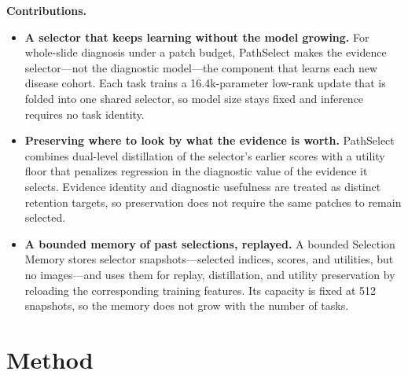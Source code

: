 \documentclass{article}
\begin{document}
\textbf{Contributions.}
\begin{itemize}
    \item \textbf{A selector that keeps learning without the model growing.} For whole-slide diagnosis under a patch budget, PathSelect makes the evidence selector---not the diagnostic model---the component that learns each new disease cohort. Each task trains a 16.4k-parameter low-rank update that is folded into one shared selector, so model size stays fixed and inference requires no task identity.
    \item \textbf{Preserving where to look by what the evidence is worth.} PathSelect combines dual-level distillation of the selector's earlier scores with a utility floor that penalizes regression in the diagnostic value of the evidence it selects. Evidence identity and diagnostic usefulness are treated as distinct retention targets, so preservation does not require the same patches to remain selected.
    \item \textbf{A bounded memory of past selections, replayed.} A bounded Selection Memory stores selector snapshots---selected indices, scores, and utilities, but no images---and uses them for replay, distillation, and utility preservation by reloading the corresponding training features. Its capacity is fixed at 512 snapshots, so the memory does not grow with the number of tasks.
\end{itemize}

\section{Method}
\label{sec:method}
\end{document}
